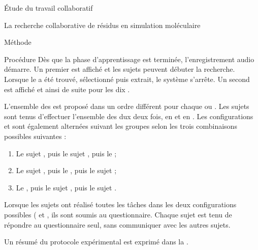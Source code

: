 \documentclass[myfrancais]{mythesis}
\begin{document}
\begin{mypart}{Étude du travail collaboratif}
\begin{mychapter}{La recherche collaborative de résidus en simulation moléculaire}
\begin{mysection}{Méthode}
\begin{mysubsection}{Procédure}
					Dès que la phase d'apprentissage est terminée, l'enregistrement audio démarre.
					Un premier  est affiché et les sujets peuvent débuter la recherche.
					Lorsque le  a été trouvé, sélectionné puis extrait, le système s'arrête.
					Un second  est affiché et ainsi de suite pour les dix .

					L'ensemble des  est proposé dans un ordre différent pour chaque  ou .
					Les sujets sont tenus d'effectuer l'ensemble des dux  deux fois, en  et en .
					Les configurations  et  sont également alternées suivant les groupes selon les trois combinaisons possibles suivantes :
					\begin{enumerate}
						\item Le sujet , puis le sujet , puis le  ;
						\item Le sujet , puis le  , puis le sujet ;
						\item Le  , puis le sujet , puis le sujet .
					\end{enumerate}

					Lorsque les sujets ont réalisé toutes les tâches dans les deux configurations possibles ( et , ils sont soumis au questionnaire.
					Chaque sujet est tenu de répondre au questionnaire seul, sans communiquer avec les autres sujets.

					Un résumé du protocole expérimental est exprimé dans la .


\end{mysubsection}
\end{mysection}
\end{mychapter}
\end{mypart}
\end{document}
